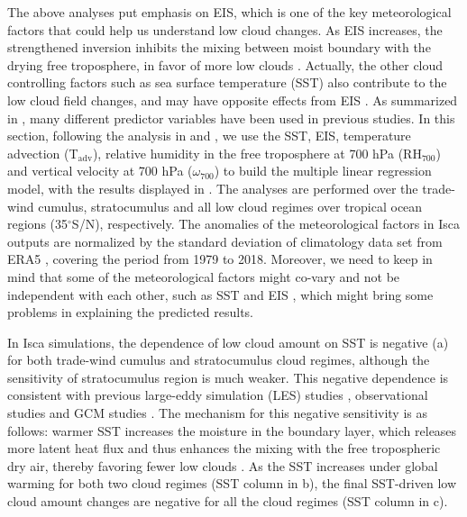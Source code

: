 The above analyses put emphasis on EIS, which is one of the key meteorological factors that could help us understand low cloud changes. As EIS increases, the strengthened inversion inhibits the mixing between moist boundary with the drying free troposphere, in favor of more low clouds \citep[e.g.,][]{Qu2014,Qu2015strength,Ceppi2017,Webb2018interactions,Scott2020}. Actually, the other cloud controlling factors such as sea surface temperature (SST) also contribute to the low cloud field changes, and may have opposite effects from EIS \citep[e.g.,][]{Bretherton2015,Myers2016,Scott2020,Myers2021,Cesana2021}. As summarized in \cite{Klein2017low}, many different predictor variables have been used in previous studies. In this section, following the analysis in \cite{Myers2016} and \cite{Zelinka2020causes}, we use the SST, EIS, temperature advection (T$_{\mathrm{adv}}$), relative humidity in the free troposphere at 700 hPa (RH$_{700}$) and vertical velocity at 700 hPa ($\omega_{700}$) to build the multiple linear regression model, with the results displayed in . The analyses are performed over the trade-wind cumulus, stratocumulus and all low cloud regimes over tropical ocean regions (35$^\circ$S/N), respectively. The anomalies of the meteorological factors in Isca outputs are normalized by the standard deviation of climatology data set from ERA5 \citep{era5}, covering the period from 1979 to 2018. Moreover, we need to keep in mind that some of the meteorological factors might co-vary and not be independent with each other, such as SST and EIS \citep{McCoy2017change}, which might bring some problems in explaining the predicted results.

In Isca simulations, the dependence of low cloud amount on SST is negative (a) for both trade-wind cumulus and stratocumulus cloud regimes, although the sensitivity of stratocumulus region is much weaker. This negative dependence is consistent with previous large-eddy simulation (LES) studies \citep[e.g.,][]{Bretherton2015}, observational studies \citep[e.g.,][]{Qu2015positive,Seethala2015,Scott2020,Myers2021} and GCM studies \citep[e.g.,][]{Myers2016}. The mechanism for this negative sensitivity is as follows: warmer SST increases the moisture in the boundary layer, which releases more latent heat flux and thus enhances the mixing with the free tropospheric dry air, thereby favoring fewer low clouds \citep{Qu2015positive,Scott2020}. As the SST increases under global warming for both two cloud regimes (SST column in b), the final SST-driven low cloud amount changes are negative for all the cloud regimes (SST column in c).

